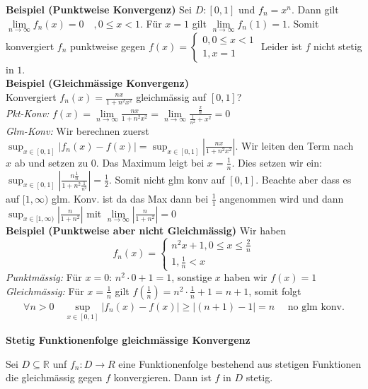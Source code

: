 \documentclass[25pt]{sciposter}
\newcommand{\limm}{\lim\limits_{n \to \infty}}
\newcommand{\R}{\mathbb{R}}
\newenvironment{method}[1]{\begin{mdframed}[backgroundcolor=blue!10,innertopmargin=15pt, innerbottommargin=15pt, nobreak=true]
		\textbf{#1 }
	}
	{ 
	\end{mdframed}
}
\begin{document}
\begin{multicols}{3}
\textbf{Beispiel (Punktweise Konvergenz)}
Sei $D:[0,1]$ und $f_n = x^n$. Dann gilt $\limm f_n(x) = 0 \quad, 0 \leq x < 1$. Für $x=1$ gilt $ \limm f_n(1) = 1$. Somit konvergiert $f_n$ punktweise gegen 
$
f(x)=
\begin{cases}
0 , 0 \leq x < 1\\
1 , x=1
\end{cases}
$ Leider ist $f$ nicht stetig in $1$.\\

\textbf{Beispiel (Gleichmässige Konvergenz)}\\
Konvergiert $f_n(x) = \frac{nx}{1+n^2 x^2}$ gleichmässig auf $\left[0,1 \right]$?\\
\textit{Pkt-Konv:} $f(x) = \limm \frac{nx}{1+n^2 x^2} = \limm \frac{\frac{x}{n}}{\frac{1}{n^2}+x^2} = 0$\\
\textit{Glm-Konv:} Wir berechnen zuerst $\sup _{x\in [0,1]} | f_n(x) -f(x) | = \sup _{x\in [0,1]} |\frac{nx}{1+n^2 x^2}|$. Wir leiten den Term nach $x$ ab und setzen zu 0. Das Maximum leigt bei $x = \frac{1}{n}$. Dies setzen wir ein:
$\sup _{x\in [0,1]} \left|\frac{n\frac{1}{n}}{1+n^2 \frac{1}{n^2}}\right| = \frac{1}{2}$. Somit nicht glm konv auf $[0,1]$. Beachte aber dass es auf $[1,\infty)$ glm. Konv. ist da das Max dann bei $\frac{1}{1}$ angenommen wird und dann $\sup _{x\in [1,\infty)} \left|\frac{n}{1+n^2}\right|$ mit $\limm \left|\frac{n}{1+n^2}\right| = 0$\\
\textbf{Beispiel (Punktweise aber nicht Gleichmässig)} Wir haben 
$$
f_n(x)=
\begin{cases}
n^2 x + 1 , 0\leq x \leq \frac{2}{n}\\
1, \frac{1}{n}<x
\end{cases}
$$
\textit{Punktmässig:} Für $x=0$: $n^2 \cdot 0 +1 = 1$, sonstige $x$ haben wir $f(x) = 1$\\
\textit{Gleichmässig:} Für $x=\frac{1}{n}$ gilt $f(\frac{1}{n}) = n^2 \cdot \frac{1}{n} + 1 = n+1$, somit folgt \begin{align*}
	\forall n > 0 \quad \sup\limits_{x \in [0,1]}|f_n(x) -f(x)|\geq |(n+1) -1| =n \quad \text{ no glm konv.}
\end{align*}


\begin{method}{Stetig Funktionenfolge gleichmässige Konvergenz}
	Sei $D \subseteq \R$ unf $f_n: D \to R$ eine Funktionenfolge bestehend aus stetigen Funktionen die gleichmässig gegen $f$ konvergieren. Dann ist $f$ in $D$ stetig.
\end{method}


\end{multicols}
\end{document}
